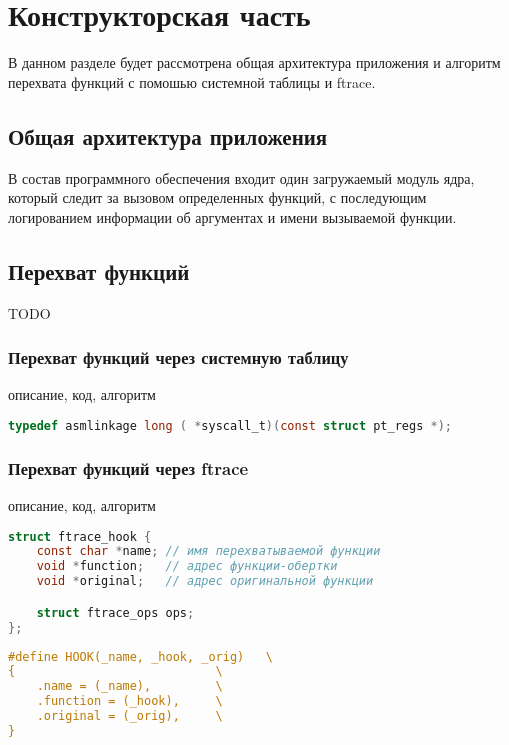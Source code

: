 \chapter{Конструкторская часть}
    В данном разделе будет рассмотрена общая архитектура приложения и 
    алгоритм перехвата функций с помошью системной таблицы и ftrace.

\section{Общая архитектура приложения}
    В состав программного обеспечения входит один загружаемый модуль ядра, 
    который следит за вызовом определенных функций, 
    с последующим логированием информации 
    об аргументах и имени вызываемой функции.

\section{Перехват функций}
    TODO
    \subsection{Перехват функций через системную таблицу}
        описание, код, алгоритм
        \begin{lstlisting}[language=C, label=lst:syscall-hooking:signature, caption=Сигнатура обработчиков системных вызовов]
typedef asmlinkage long ( *syscall_t)(const struct pt_regs *);
        \end{lstlisting}
    
    \subsection{Перехват функций через ftrace}
        описание, код, алгоритм

    
        \begin{lstlisting}[language=C, label=lst:ftrace-hooking:struct, caption=Структура перехватываемой функции]
struct ftrace_hook {
    const char *name; // имя перехватываемой функции
    void *function;   // адрес функции-обертки
    void *original;   // адрес оригинальной функции

    struct ftrace_ops ops;
};
        \end{lstlisting}

        \begin{lstlisting}[language=C, label=lst:ftrace-hooking:struct, caption=Макрос для заполнения структуры перехватываемой функции]
#define HOOK(_name, _hook, _orig)   \
{                            \
    .name = (_name),         \
    .function = (_hook),     \
    .original = (_orig),     \
}
        \end{lstlisting}

